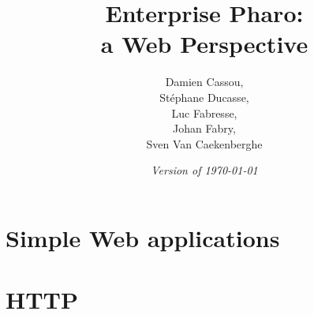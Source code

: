\graphicspath{
        {../figures/}
        {../Copyright/}
        {../PillarChap/}
        {../Artefact/}
        {../Zinc-HTTP-Client/}
        {../Zinc-HTTP-Server/}
        {../Zinc-Encoding-Meta/}
        {../Zinc-REST/}
        {../Fuel/}
        {../STON/}
        {../Voyage/}
        {../WebApp/}
        {../WebSockets/}
        {../NeoJSON/}
        {../RenoirST/}
        {../NeoCSV/}
        {../Teapot/}
        {../Mustache/}
}
\let\wholebook=\relax
\renewcommand{\nnbb}[2]{} %

\frontmatter
\setcounter{page}{1}
\pagestyle{headings}
\author{
        Damien Cassou,\\ St\'ephane Ducasse,\\ Luc Fabresse,\\ Johan Fabry,\\ Sven Van Caekenberghe}
\title{\Huge\bf Enterprise Pharo:\\a Web Perspective}
\isodate
\date{\emph{Version of \today}}
\maketitle
\tableofcontents

\sloppy %
\mainmatter



\part{Simple Web applications}




\part{HTTP}








